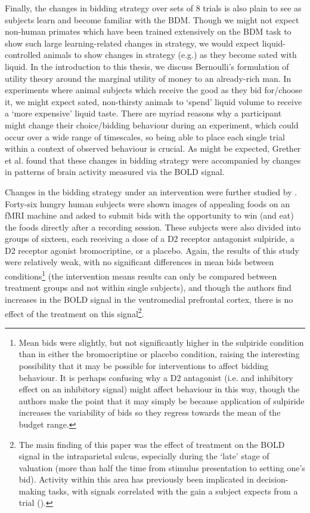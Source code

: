 Finally, the changes in bidding strategy over sets of 8 trials is also plain to see as subjects learn and become familiar with the BDM. Though we might not expect non-human primates which have been trained extensively on the BDM task to show such large learning-related changes in strategy, we would expect liquid-controlled animals to show changes in strategy (e.g.) as they become sated with liquid. In the introduction to this thesis, we discuss Bernoulli’s formulation of utility theory around the marginal utility of money to an already-rich man. In experiments where animal subjects which receive the good as they bid for/choose it, we might expect sated, non-thirsty animals to ‘spend’ liquid volume to receive a ‘more expensive’ liquid taste. There are myriad reasons why a participant might change their choice/bidding behaviour during an experiment, which could occur over a wide range of timescales, so being able to place each single trial within a context of observed behaviour is crucial. As might be expected, Grether et al. found that these changes in bidding strategy were accompanied by changes in patterns of brain activity measured via the BOLD signal.

Changes in the bidding strategy under an intervention were further studied by \cite{medicDopamineModulatesNeural2014}. Forty-six hungry human subjects were shown images of appealing foods on an fMRI machine and asked to submit bids with the opportunity to win (and eat) the foods directly after a recording session. These subjects were also divided into groups of sixteen, each receiving a dose of a D2 receptor antagonist sulpiride, a D2 receptor agonist bromocriptine, or a placebo. Again, the results of this study were relatively weak, with no significant differences in mean bids between conditions\footnote{Mean bids were slightly, but not significantly higher in the sulpiride condition than in either the bromocriptine or placebo condition, raising the interesting possibility that it may be possible for interventions to affect bidding behaviour. It is perhaps confusing why a D2 antagonist (i.e. and inhibitory effect on an inhibitory signal) might affect behaviour in this way, though the authors make the point that it may simply be because application of sulpiride increases the variability of bids so they regress towards the mean of the budget range.} (the intervention means results can only be compared between treatment groups and not within single subjects), and though the authors find increases in the BOLD signal in the ventromedial prefrontal cortex, there is no effect of the treatment on this signal\footnote{The main finding of this paper was the effect of treatment on the BOLD signal in the intraparietal sulcus, especially during the ‘late’ stage of valuation (more than half the time from stimulus presentation to setting one’s bid). Activity within this area has previously been implicated in decision-making tasks, with signals correlated with the gain a subject expects from a trial (\cite{plattNeuralCorrelatesDecision1999}).}.

